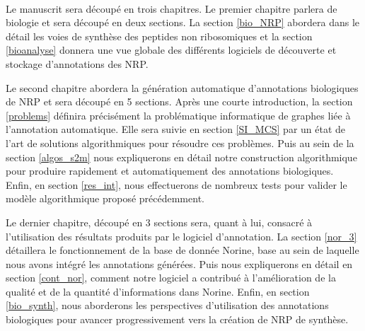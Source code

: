 ~~

Le manuscrit sera découpé en trois chapitres.
Le premier chapitre parlera de biologie et sera découpé en deux sections.
La section \ref{bio_NRP} abordera dans le détail les voies de synthèse des peptides non ribosomiques et la section \ref{bioanalyse} donnera une vue globale des différents logiciels de découverte et stockage d'annotations des NRP.

Le second chapitre abordera la génération automatique d'annotations biologiques de NRP et sera découpé en 5 sections.
Après une courte introduction, la section \ref{problems} définira précisément la problématique informatique de graphes liée à l'annotation automatique.
Elle sera suivie en section \ref{SI_MCS} par un état de l'art de solutions algorithmiques pour résoudre ces problèmes.
Puis au sein de la section \ref{algos_s2m} nous expliquerons en détail notre construction algorithmique pour produire rapidement et automatiquement des annotations biologiques.
Enfin, en section \ref{res_int}, nous effectuerons de nombreux tests pour valider le modèle algorithmique proposé précédemment.

Le dernier chapitre, découpé en 3 sections sera, quant à lui, consacré à l'utilisation des résultats produits par le logiciel d'annotation.
La section \ref{nor_3} détaillera le fonctionnement de la base de donnée Norine, base au sein de laquelle nous avons intégré les annotations générées.
Puis nous expliquerons en détail en section \ref{cont_nor}, comment notre logiciel a contribué à l'amélioration de la qualité et de la quantité d'informations dans Norine.
Enfin, en section \ref{bio_synth}, nous aborderons les perspectives d'utilisation des annotations biologiques pour avancer progressivement vers la création de NRP de synthèse.